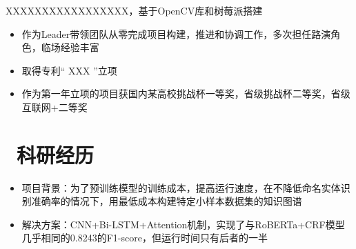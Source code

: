\documentclass{resume}
\begin{document}
XXXXXXXXXXXXXXXXX，基于OpenCV库和树莓派搭建
\begin{itemize}
  \item 作为Leader带领团队从零完成项目构建，推进和协调工作，多次担任路演角色，临场经验丰富
  \item 取得专利“ XXX ”立项
  \item 作为第一年立项的项目获国内某高校挑战杯一等奖，省级挑战杯二等奖，省级互联网+二等奖
\end{itemize}

\section{\faHeartO\ 科研经历}
\begin{itemize}
  \item 项目背景：为了预训练模型的训练成本，提高运行速度，在不降低命名实体识别准确率的情况下，用最低成本构建特定小样本数据集的知识图谱
  \item 解决方案：CNN+Bi-LSTM+Attention机制，实现了与RoBERTa+CRF模型几乎相同的0.8243的F1-score，但运行时间只有后者的一半
\end{itemize}
\end{document}

